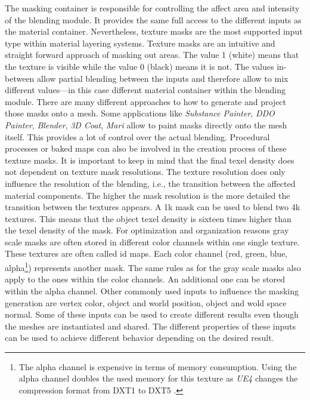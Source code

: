 	The masking container is responsible for controlling the affect area and intensity of the blending module. It provides the same full access to the different inputs as the material container. Nevertheless, texture masks are the most supported input type within material layering systems.  
	Texture masks are an intuitive and straight forward approach of masking out areas. The value 1 (white) means that the texture is visible while the value 0 (black) means it is not. The values in-between allow partial blending between the inputs and therefore allow to mix different values---in this case different material container within the blending module. 
	There are many different approaches to how to generate and project those masks onto a mesh. Some applications like \emph{Substance Painter}, \emph{DDO Painter}, \emph{Blender}, \emph{3D Coat}, \emph{Mari} allow to paint masks directly onto the mesh itself. This provides a lot of control over the actual blending. Procedural processes or baked maps can also be involved in the creation process of these texture masks.
	It is important to keep in mind that the final texel density does not dependent on texture mask resolutions. The texture resolution does only influence the resolution of the blending, i.e., the transition between the affected material components. The higher the mask resolution is the more detailed the transition between the textures appears. A 1k mask can be used to blend two 4k textures. This means that the object texel density is sixteen times higher than the texel density of the mask. For optimization and organization reasons gray scale masks are often stored in different color channels within one single texture. These textures are often called id maps. Each color channel (red, green, blue, alpha\footnote{The alpha channel is expensive in terms of memory consumption.  Using the alpha channel doubles the used memory for this texture as \emph{UE4} changes the compression format from DXT1 to DXT5 \cite{epic2015supportsettings}.}) represents another mask. The same rules as for the gray scale masks also apply to the ones within the color channels. An additional one can be stored within the alpha channel. Other commonly used inputs to influence the masking generation are vertex color, object and world position, object and wold space normal. Some of these inputs can be used to create different results even though the meshes are instantiated and shared. The different properties of these inputs can be used to achieve different behavior depending on the desired result.  
	
